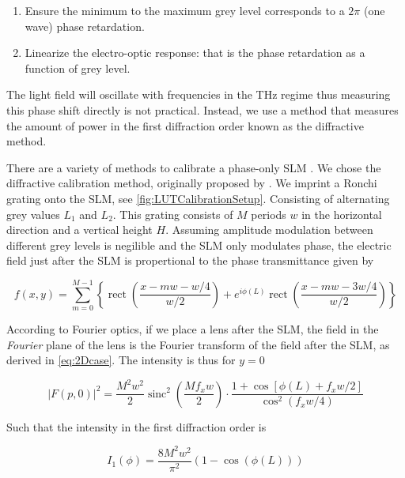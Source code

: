 \begin{enumerate}
    \itemsep=0pt
    
    \item Ensure the minimum to the maximum grey level corresponds to a $2\pi$ (one wave) phase retardation.
    
    \item Linearize the electro-optic response: that is the phase retardation as a function of grey level. 
\end{enumerate}


The light field will oscillate with frequencies in the THz regime thus measuring this phase shift directly is not practical. 
Instead, we use a method that measures the amount of power in the first diffraction order known as the diffractive method. 

There are a variety of methods to calibrate a phase-only \ac{SLM} \cite{Li2019}. 
We chose the diffractive calibration method, originally proposed by \cite{Zhang1994}.
We imprint a Ronchi grating onto the SLM, see \cref{fig:LUTCalibrationSetup}.
Consisting of alternating grey values $L_1$ and $L_2$.
This grating consists of $M$ periods $w$ in the horizontal direction and a vertical height $H$. 
Assuming amplitude modulation between different grey levels is negilible and the SLM only modulates phase, the electric field just after the SLM is propertional to the phase transmittance given by

\begin{equation}\label{eq:FieldAfterSLM}
    f(x,y) = \sum_{m=0}^{M-1} \left\{
    \operatorname{rect}\left(\frac{x-m w - w/4}{w/2}\right) + e^{i \phi(L)} \operatorname{rect}\left(\frac{x - m w - 3 w/4}{w/2}\right)
    \right\}
\end{equation}

According to Fourier optics, if we place a lens after the SLM, the field in the \textit{Fourier} plane of the lens is the Fourier transform of the field after the SLM, as derived in \cref{eq:2Dcase}.
The intensity is thus for $y=0$

\begin{equation}\label{eq:FourierIntensity}
    |F(p,0)|^2=
    \frac{M^2 w^2}{2}\operatorname{sinc}^2\left(\frac{M f_x w}{2}\right) \cdot
    \frac{1 + \cos{\left[\phi(L)+f_x w/2\right]}}{\cos^2(f_x w/4)}
\end{equation}

Such that the intensity in the first diffraction order is

\begin{equation}\label{eq:IntensityFirstOrder}
    I_1(\phi) =
    \frac{8M^2w^2}{\pi^2} \left( 
    1-\cos{(\phi(L))}
    \right)
\end{equation}


